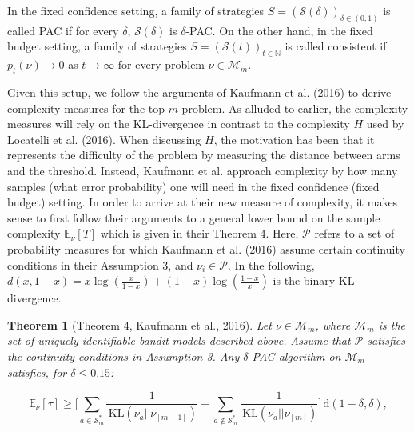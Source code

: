 \documentclass[11pt,]{article}
\newtheorem{theorem}{Theorem}
\newcommand{\KL}{\,\text{KL}}
\newcommand{\der}{\,\text{d}}
\begin{document}
In the fixed confidence setting, a family of strategies
\(S = (\mathcal{S}(\delta))_{\delta \in (0,1)}\) is called PAC if for
every \(\delta\), \(\mathcal{S}(\delta)\) is \(\delta\)-PAC. On the
other hand, in the fixed budget setting, a family of strategies
\(S = (\mathcal{S}(t))_{t \in \mathbb{N}}\) is called consistent if
\(p_t(\nu) \rightarrow 0\) as \(t \rightarrow \infty\) for every problem
\(\nu \in \mathcal{M}_m\).

Given this setup, we follow the arguments of Kaufmann et al. (2016) to
derive complexity measures for the top-\(m\) problem. As alluded to
earlier, the complexity measures will rely on the KL-divergence in
contrast to the complexity \(H\) used by Locatelli et al. (2016). When
discussing \(H\), the motivation has been that it represents the
difficulty of the problem by measuring the distance between arms and the
threshold. Instead, Kaufmann et al. approach complexity by how many
samples (what error probability) one will need in the fixed confidence
(fixed budget) setting. In order to arrive at their new measure of
complexity, it makes sense to first follow their arguments to a general
lower bound on the sample complexity \(\mathbb{E}_{\nu}[T]\) which is
given in their Theorem 4. Here, \(\mathcal{P}\) refers to a set of
probability measures for which Kaufmann et al. (2016) assume certain
continuity conditions in their Assumption 3, and
\(\nu_i \in \mathcal{P}\). In the following,
\(d(x,1-x) = x\log(\frac{x}{1-x}) + (1-x) \log(\frac{1-x}{x})\) is the
binary KL-divergence.

\begin{theorem}[Theorem 4, Kaufmann et al., 2016] \label{theorem:KaufmannEtAlTheorem4}
Let $\nu \in \mathcal{M}_m$, where $\mathcal{M}_m$ is the set of uniquely identifiable bandit models described above. Assume that $\mathcal{P}$ satisfies the continuity conditions in Assumption 3. Any $\delta$-PAC algorithm on $\mathcal{M}_m$ satisfies, for $\delta \leq 0.15$:

\begin{equation*}
\mathbb{E}_{\nu}[\tau] \geq \Big[ \sum_{a \in \mathcal{S}^*_m} \frac{1}{\KL(\nu_a || \nu_{[m+1]})} + \sum_{a \notin \mathcal{S}^*_m} \frac{1}{\KL(\nu_a || \nu_{[m]})} \Big] \der(1-\delta, \delta),
\end{equation*}
\end{theorem}
\end{document}
